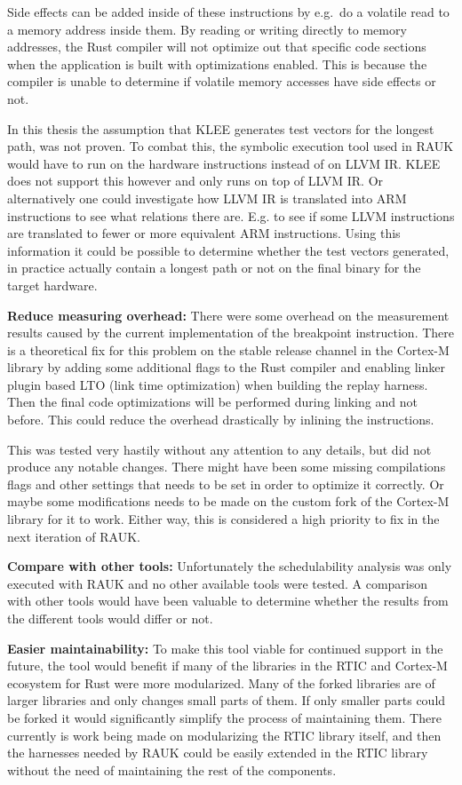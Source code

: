 Side effects can be added inside of these instructions by e.g.\ do a volatile
read to a memory address inside them. By reading or writing directly to memory
addresses, the Rust compiler will not optimize out that specific code sections
when the application is built with optimizations enabled. This is because the
compiler is unable to determine if volatile memory accesses have side effects
or not.

In this thesis the assumption that KLEE generates test vectors for the longest
path, was not proven. To combat this, the symbolic execution tool used in RAUK
would have to run on the hardware instructions instead of on LLVM IR. KLEE does
not support this however and only runs on top of LLVM IR. Or alternatively one
could investigate how LLVM IR is translated into ARM instructions to see what
relations there are. E.g. to see if some LLVM instructions are translated to
fewer or more equivalent ARM instructions. Using this information it could
be possible to determine whether the test vectors generated, in practice
actually contain a longest path or not on the final binary for the target
hardware.

\textbf{Reduce measuring overhead:} There were some overhead on the measurement
results caused by the current implementation of the breakpoint instruction.
There is a theoretical fix for this problem on the stable release channel in
the Cortex-M library by adding some additional flags to the Rust compiler and
enabling linker plugin based LTO (link time optimization) when building the
replay harness. Then the final code optimizations will be performed during
linking and not before. This could reduce the overhead drastically by inlining
the instructions. 

This was tested very hastily without any attention to any details, but did not
produce any notable changes. There might have been some missing compilations
flags and other settings that needs to be set in order to optimize it
correctly. Or maybe some modifications needs to be made on the custom fork of
the Cortex-M library for it to work. Either way, this is considered a high
priority to fix in the next iteration of RAUK.

\textbf{Compare with other tools:} Unfortunately the schedulability analysis
was only executed with RAUK and no other available tools were tested. A
comparison with other tools would have been valuable to determine whether the
results from the different tools would differ or not. 

\textbf{Easier maintainability:} To make this tool viable for continued support
in the future, the tool would benefit if many of the libraries in the RTIC and
Cortex-M ecosystem for Rust were more modularized. Many of the forked libraries
are of larger libraries and only changes small parts of them. If only smaller
parts could be forked it would significantly simplify the process of
maintaining them. There currently is work being made on modularizing the RTIC
library itself, and then the harnesses needed by RAUK could be easily extended
in the RTIC library without the need of maintaining the rest of the components.

